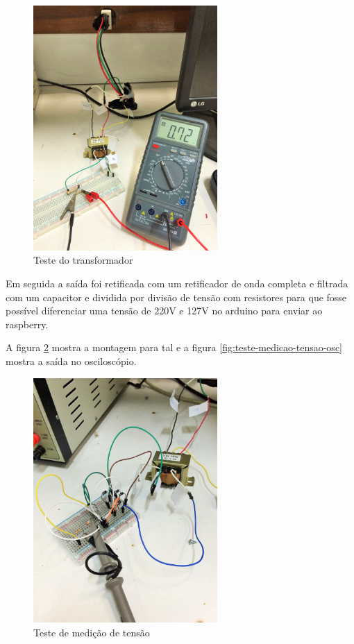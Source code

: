 \begin{figure}[H]
\centering
\includegraphics[width=7cm,keepaspectratio]{figuras/sensor-tensao.jpg} 
\caption{\label{fig:sensor-tensao} Teste do transformador}
\end{figure}

Em seguida a saída foi retificada com um retificador de onda completa e filtrada com um capacitor e dividida por divisão de tensão com resistores para que fosse possível diferenciar uma tensão de 220V e 127V no arduino para enviar ao raspberry.

A figura \ref{fig:teste-medicao-tensao} mostra a montagem para tal e a figura \ref{fig:teste-medicao-tensao-osc} mostra a saída no osciloscópio.

\begin{figure}[H]
\centering
\includegraphics[width=7cm,keepaspectratio]{figuras/teste-medicao-tensao.jpg} 
\caption{\label{fig:teste-medicao-tensao} Teste de medição de tensão} 
\end{figure}


